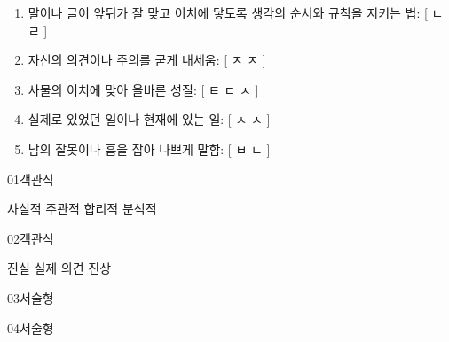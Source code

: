 \documentclass[fs95,seriesFre]{korfarm-base}
\begin{document}
\kfActivityBg \par{}\par\nopagebreak[4]\smallskip\nopagebreak[4]
\begin{kfConnect}
\end{kfConnect}

\kfActivityBg \par{}\par\nopagebreak[4]\smallskip\nopagebreak[4]
\begin{enumerate}[leftmargin=22pt, itemsep=6pt, topsep=4pt, label=\textbf{\arabic*.}]
\item 말이나 글이 앞뒤가 잘 맞고 이치에 닿도록 생각의 순서와 규칙을 지키는 법: [  ㄴ  ㄹ  ]
\item 자신의 의견이나 주의를 굳게 내세움: [  ㅈ  ㅈ  ]
\item 사물의 이치에 맞아 올바른 성질: [  ㅌ  ㄷ  ㅅ  ]
\item 실제로 있었던 일이나 현재에 있는 일: [  ㅅ  ㅅ  ]
\item 남의 잘못이나 흠을 잡아 나쁘게 말함: [  ㅂ  ㄴ  ]
\end{enumerate}


\begin{kfQBlock}{01}{객관식}
\begin{kfChoices}
\kfChoice 사실적
\kfChoice 주관적
\kfChoice 합리적
\kfChoice 분석적
\end{kfChoices}
\end{kfQBlock}
\begin{kfQBlock}{02}{객관식}
\begin{kfChoices}
\kfChoice 진실
\kfChoice 실제
\kfChoice 의견
\kfChoice 진상
\end{kfChoices}
\end{kfQBlock}
\begin{kfQBlock}{03}{서술형}
\end{kfQBlock}
\begin{kfQBlock}{04}{서술형}
\end{kfQBlock}
\end{document}
